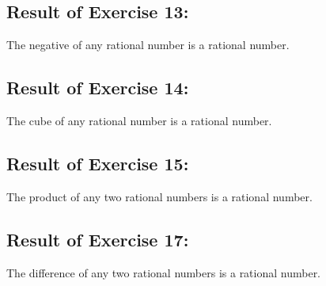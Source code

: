 \documentclass[11pt]{article}
\begin{document}
\subsection*{Result of Exercise 13:}
The negative of any rational number is a rational number. 

\subsection*{Result of Exercise 14:}
The cube of any rational number is a rational number. 

\subsection*{Result of Exercise 15:}
The product of any two rational numbers is a rational number. 

\subsection*{Result of Exercise 17:}
The difference of any two rational numbers is a rational number. 

\newpage
\end{document}
